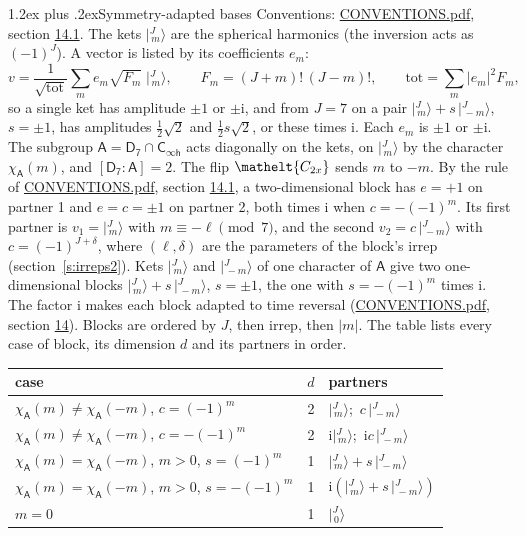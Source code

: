 \documentclass[10pt,a4paper]{article}
\makeatletter
\renewcommand\section{\@startsection{section}{1}{\z@}{-3ex plus -1ex minus -.2ex}%
  {1.2ex plus .2ex}{\normalfont\large\sffamily\bfseries\color{parttitle}}}
\numberwithin{equation}{section}
\newcommand{\eltfont}[1]{{\let\sigma\eltsigma\mathelt{#1}}}
\newcommand{\grp}[1]{\mathsf{#1}}
\newcommand{\elt}[1]{\eltfont{#1}}
\newcommand{\grpindex}[2]{[#1 : #2]}
\newcommand{\iunit}{\mathrm{i}}
\newcommand{\chiA}{\chi_{\grp{A}}}
\newcommand{\jm}[2]{\bigl\lvert{}^{#1}_{\,#2}\bigr\rangle}
\makeatother
\begin{document}
\section{Symmetry-adapted bases}\label{s:bases}
Conventions: \href{../../CONVENTIONS.pdf}{CONVENTIONS.pdf}, section \href{../../CONVENTIONS.pdf\#conv.14.1}{14.1}.
\leavevmode\label{n:index.m}\label{n:vector.ket}The kets $\jm{J}{m}$ are the spherical harmonics (the inversion acts as $(-1)^J$). \label{n:index.ketcoefficient}\label{n:vector.basis.symmetry}\label{n:index.ketweight}\label{n:index.total}A vector is listed by its coefficients $e_m$:
\begin{equation}\label{e:ket}v = \frac{1}{\sqrt{\mathrm{tot}}}\sum_m e_m\sqrt{F_m}\;\jm{J}{m},\qquad F_m = (J+m)!\,(J-m)!,\qquad \mathrm{tot} = \sum_m |e_m|^2F_m,\end{equation}
\leavevmode\label{n:index.pair.sign}so a single ket has amplitude $\pm1$ or $\pm\iunit$, and from $J = 7$ on a pair $\jm{J}{m} + s\,\jm{J}{-m}$, $s = \pm1$, has amplitudes $\tfrac{1}{2}\sqrt{2}$ and $\tfrac{1}{2}s\sqrt{2}$, or these times $\iunit$. Each $e_m$ is $\pm1$ or $\pm\iunit$.
\leavevmode\label{n:group.A}\label{n:function.character.abelian}The subgroup $\grp{A} = \grp{D_{7}}\cap\grp{C_{\infty h}}$ acts diagonally on the kets, on $\jm{J}{m}$ by the character $\chiA(m)$, and $\grpindex{\grp{D_{7}}}{\grp{A}} = 2$. The flip $\elt{C_{2x}}$ sends $m$ to $-m$. \label{n:index.partner.sign}By the rule of \href{../../CONVENTIONS.pdf}{CONVENTIONS.pdf}, section \href{../../CONVENTIONS.pdf\#conv.14.1}{14.1}, a two-dimensional block has $e = +1$ on partner 1 and $e = c = \pm1$ on partner 2, both times $\iunit$ when $c = -(-1)^m$. Its first partner is $v_1 = \jm{J}{m}$ with $m \equiv -\ell \pmod{7}$, and the second $v_2 = c\,\jm{J}{-m}$ with $c = (-1)^{J+\delta}$, where $(\ell, \delta)$ are the parameters of the block's irrep (section~\ref{s:irreps2}). Kets $\jm{J}{m}$ and $\jm{J}{-m}$ of one character of $\grp{A}$ give two one-dimensional blocks $\jm{J}{m} + s\,\jm{J}{-m}$, $s = \pm1$, the one with $s = -(-1)^m$ times $\iunit$. The factor $\iunit$ makes each block adapted to time reversal (\href{../../CONVENTIONS.pdf}{CONVENTIONS.pdf}, section \href{../../CONVENTIONS.pdf\#conv.14}{14}). Blocks are ordered by $J$, then irrep, then $|m|$.
\leavevmode\label{n:head.case}\label{n:head.partners}The table lists every case of block, its dimension $d$ and its partners in order.
\begin{center}\begin{tabular}{@{}lrl@{}}\toprule
case & $d$ & partners\\\midrule
$\chiA(m) \ne \chiA(-m)$, $c = (-1)^m$ & 2 & $\jm{J}{m}$;\ $c\,\jm{J}{-m}$\\
$\chiA(m) \ne \chiA(-m)$, $c = -(-1)^m$ & 2 & $\iunit\jm{J}{m}$;\ $\iunit c\,\jm{J}{-m}$\\
$\chiA(m) = \chiA(-m)$, $m > 0$, $s = (-1)^m$ & 1 & $\jm{J}{m} + s\,\jm{J}{-m}$\\
$\chiA(m) = \chiA(-m)$, $m > 0$, $s = -(-1)^m$ & 1 & $\iunit(\jm{J}{m} + s\,\jm{J}{-m})$\\
$m = 0$ & 1 & $\jm{J}{0}$\\
\bottomrule\end{tabular}\end{center}
\end{document}
